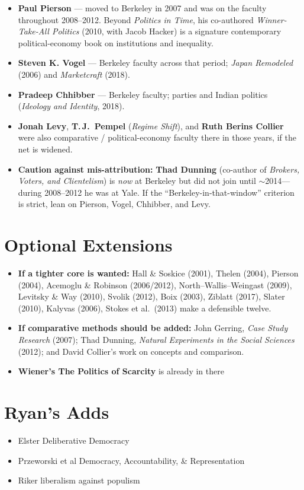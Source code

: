 \documentclass[12pt]{article}
\begin{document}
\begin{itemize}[leftmargin=*, itemsep=4pt]
    \item \textbf{Paul Pierson} --- moved to Berkeley in 2007 and was on the faculty throughout 2008--2012. Beyond \textit{Politics in Time}, his co-authored \textit{Winner-Take-All Politics} (2010, with Jacob Hacker) is a signature contemporary political-economy book on institutions and inequality.
    \item \textbf{Steven K. Vogel} --- Berkeley faculty across that period; \textit{Japan Remodeled} (2006) and \textit{Marketcraft} (2018).
    \item \textbf{Pradeep Chhibber} --- Berkeley faculty; parties and Indian politics (\textit{Ideology and Identity}, 2018).
    \item \textbf{Jonah Levy}, \textbf{T.\,J.\ Pempel} (\textit{Regime Shift}), and \textbf{Ruth Berins Collier} were also comparative / political-economy faculty there in those years, if the net is widened.
    \item \textbf{Caution against mis-attribution:} \textbf{Thad Dunning} (co-author of \textit{Brokers, Voters, and Clientelism}) is \emph{now} at Berkeley but did not join until $\sim$2014---during 2008--2012 he was at Yale. If the ``Berkeley-in-that-window'' criterion is strict, lean on Pierson, Vogel, Chhibber, and Levy.
\end{itemize}

\section{Optional Extensions}

\begin{itemize}[leftmargin=*, itemsep=4pt]
    \item \textbf{If a tighter core is wanted:} Hall \& Soskice (2001), Thelen (2004), Pierson (2004), Acemoglu \& Robinson (2006/2012), North--Wallis--Weingast (2009), Levitsky \& Way (2010), Svolik (2012), Boix (2003), Ziblatt (2017), Slater (2010), Kalyvas (2006), Stokes et al.\ (2013) make a defensible twelve.
    \item \textbf{If comparative methods should be added:} John Gerring, \textit{Case Study Research} (2007); Thad Dunning, \textit{Natural Experiments in the Social Sciences} (2012); and David Collier's work on concepts and comparison.
    \item \textbf{Wiener's The Politics of Scarcity} is already in there
\end{itemize}


\section{Ryan's Adds}

\begin{itemize}
    \item Elster Deliberative Democracy
    \item Przeworski et al Democracy, Accountability, \& Representation
    \item Riker liberalism against populism
\end{itemize}
\end{document}
